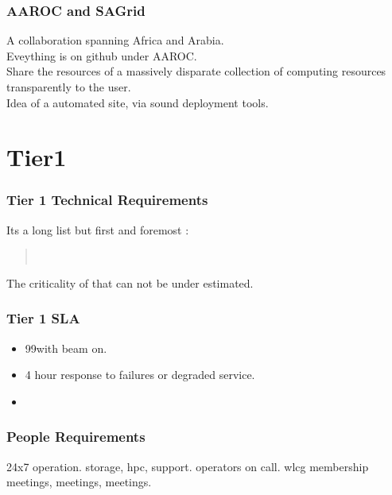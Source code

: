 \documentclass{beamer}
\begin{document}
\begin{frame}
\frametitle{AAROC and SAGrid}
A collaboration spanning Africa and Arabia.\\
Eveything is on github under AAROC.\\
Share the resources of a massively disparate collection of computing resources transparently to the user.\\
Idea of a automated site, via sound deployment tools.
\end{frame}

\section{Tier1}

\begin{frame}
\frametitle{Tier 1 Technical Requirements} 
Its a long list but first and foremost :\\
\begin{quote}
  \\
\end{quote}
The criticality of that can not be under estimated.
\end{frame}

\begin{frame}
  \frametitle{Tier 1 SLA}
  \begin{itemize}
    \item 99\uptime with beam on.
    \item 4 hour response to failures or degraded service.
    \item 
  \end{itemize}
\end{frame}
\begin{frame}
\frametitle{People Requirements} 
24x7 operation.
storage, hpc, support.
operators on call.
wlcg membership
meetings, meetings, meetings.
\end{frame}
\end{document}
